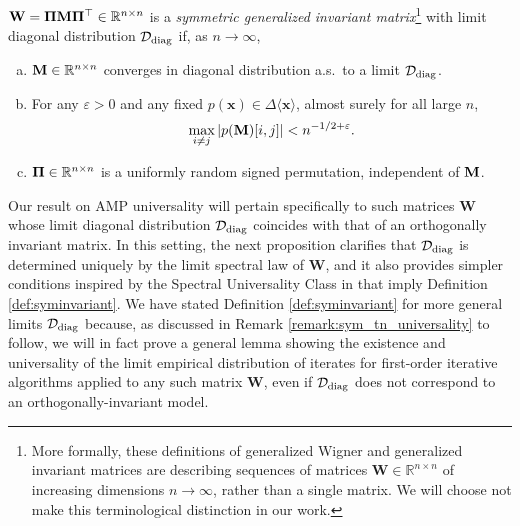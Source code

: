 \documentclass[10pt,reqno]{amsart}
\def\x{\mathbf{x}}
\def\W{\mathbf{W}}
\def\R{\mathbb{R}}
\def\bW{{\mathbf{W}}}
\def\eps{\varepsilon}
\newcommand{\tdiag}{\mathrm{diag}}
\begin{document}
\begin{definition}\label{def:syminvariant}
$\W=\bPi \bM \bPi^\top\in \R^{n \times n}$ is a 
\emph{symmetric generalized invariant matrix}\footnote{More formally, these
definitions of generalized Wigner and generalized invariant matrices are
describing sequences of matrices $\bW \in \R^{n \times n}$ of increasing
dimensions $n \to \infty$, rather than a single matrix.
We will choose not make this terminological distinction in our work.}
with limit diagonal distribution $\cD_\tdiag$ if, as $n \to \infty$,
\begin{enumerate}[(a)]
\item $\Mb \in \R^{n \times n}$ converges in
diagonal distribution a.s.\ to a limit $\cD_\tdiag$.
\item For any $\eps>0$ and any fixed $p(\x)\in\Delta\langle\x\rangle$, almost
surely for all large $n$,
\begin{align*}
	\max_{i\neq j} |p(\Mb)[i,j]| < n^{-1/2+\eps}.
\end{align*}
\item $\bm{\Pi}\in\mathbb{R}^{n\times n}$ is a uniformly random signed permutation,
independent of $\mathbf{M}$.
\end{enumerate}
\end{definition}

Our result on AMP universality will pertain specifically
to such matrices $\W$ whose limit
diagonal distribution $\cD_\tdiag$ coincides with that of an orthogonally
invariant matrix. In this setting, the next proposition clarifies
that $\cD_\tdiag$ is determined uniquely by the limit spectral law of $\bW$,
and it also provides simpler conditions inspired by the Spectral Universality
Class in \cite{dudeja2022spectral} that imply Definition \ref{def:syminvariant}.
We have stated Definition \ref{def:syminvariant} for more general
limits $\cD_\tdiag$ because, as
discussed in Remark \ref{remark:sym_tn_universality} to follow, we will in fact prove
a general lemma showing the existence and universality of the limit empirical
distribution of iterates for first-order iterative algorithms
applied to any such matrix $\W$, even if $\cD_\tdiag$ does not correspond to an
orthogonally-invariant model.
\end{document}

